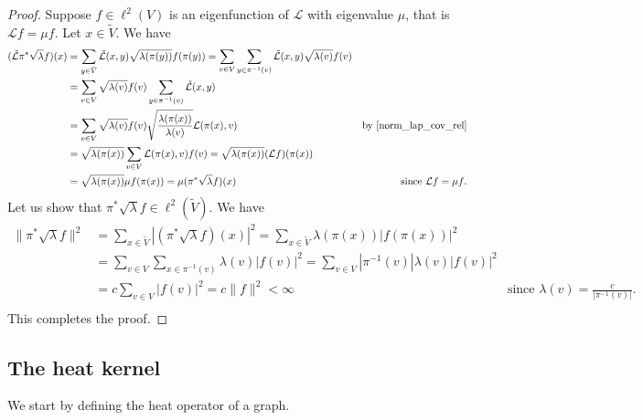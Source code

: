 \documentclass[11pt]{amsart}
\theoremstyle{definition}
\theoremstyle{remark}
\theoremstyle{plain}
\numberwithin{equation}{section}
\numberwithin{lemma}{section}
\numberwithin{definition}{section}
\numberwithin{proposition}{section}
\numberwithin{corollary}{section}
\numberwithin{theorem}{section}
\numberwithin{remark}{section}
\begin{document}
\begin{proof}
 Suppose $f\in \ell^2(V)$ is an eigenfunction of $\mathcal{L}$ with eigenvalue $\mu$, that is $\mathcal{L}f=\mu f$. Let $x\in \tilde{V}$. We have
 \begin{align*}
 (\tilde{\mathcal{L}}\pi^{*}\sqrt{\lambda}f)(x) & = \sum_{y\in\tilde{V}} \tilde{\mathcal{L}}(x,y) \sqrt{\lambda(\pi(y))}f(\pi(y)) 
  = \sum_{v\in V} \sum_{y\in\pi^{-1}(v)} \tilde{\mathcal{L}}(x,y) \sqrt{\lambda(v)}f(v) \\
 & = \sum_{v\in V} \sqrt{\lambda(v)}f(v) \sum_{y\in\pi^{-1}(v)} \tilde{\mathcal{L}}(x,y)  & \text{}\\
 & = \sum_{v\in V} \sqrt{\lambda(v)}f(v) \sqrt{\frac{\lambda(\pi(x))}{\lambda(v)}} \mathcal{L} (\pi(x),v)  & \text{by \eqref{norm_lap_cov_rel}}\\
 & = \sqrt{\lambda(\pi(x))} \sum_{v\in V}  \mathcal{L} (\pi(x),v) f(v) =  \sqrt{\lambda(\pi(x))} (\mathcal{L}f)(\pi(x)) \\
 & = \sqrt{\lambda(\pi(x))} \mu f(\pi(x)) = \mu (\pi^{*}\sqrt{\lambda}f)(x) & \text{since $\mathcal{L}f=\mu f$}.
\end{align*}
Let us show that $\pi^{*}\sqrt{\lambda}f \in \ell^2(\tilde{V})$. We have
 \begin{align*}
 \| \pi^{*}\sqrt{\lambda}f \|^2 & = \sum_{x\in \tilde{V}} |(\pi^{*}\sqrt{\lambda}f)(x)|^2 
 = \sum_{x\in \tilde{V}} \lambda(\pi(x)) |f(\pi(x))|^2 \\
 & = \sum_{v\in V}\sum_{x\in \pi^{-1}(v)} \lambda(v) |f(v)|^2 = \sum_{v\in V} |\pi^{-1}(v)| \lambda(v) |f(v)|^2 \\
 & = c \sum_{v\in V} |f(v)|^2 = c \|f\|^2 < \infty & \text{since $\lambda(v)=\frac{c}{|\pi^{-1}(v)|}.$}\\
\end{align*}
This completes the proof.
\end{proof}

 
\subsection{The heat kernel}
We start by defining the heat operator of a graph. 
\end{document}
